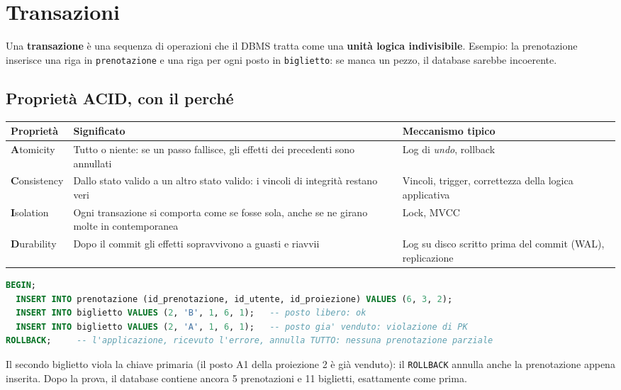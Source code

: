 \section{Transazioni}
Una \textbf{transazione} è una sequenza di operazioni che il DBMS tratta come una \textbf{unità logica indivisibile}. Esempio: la prenotazione inserisce una riga in \texttt{prenotazione} e una riga per ogni posto in \texttt{biglietto}: se manca un pezzo, il database sarebbe incoerente.

\subsection{Proprietà ACID, con il perché}
\begin{center}
\small
\begin{tabularx}{\textwidth}{@{}>{\raggedright\arraybackslash}p{2.4cm}XX@{}}
\toprule
\textbf{Proprietà} & \textbf{Significato} & \textbf{Meccanismo tipico} \\
\midrule
\textbf{A}tomicity & Tutto o niente: se un passo fallisce, gli effetti dei precedenti sono annullati & Log di \emph{undo}, rollback \\
\textbf{C}onsistency & Dallo stato valido a un altro stato valido: i vincoli di integrità restano veri & Vincoli, trigger, correttezza della logica applicativa \\
\textbf{I}solation & Ogni transazione si comporta come se fosse sola, anche se ne girano molte in contemporanea & Lock, MVCC \\
\textbf{D}urability & Dopo il commit gli effetti sopravvivono a guasti e riavvii & Log su disco scritto prima del commit (WAL), replicazione \\
\bottomrule
\end{tabularx}
\end{center}

\begin{lstlisting}[language=SQL, caption={Transazione: o tutto o niente}]
BEGIN;
  INSERT INTO prenotazione (id_prenotazione, id_utente, id_proiezione) VALUES (6, 3, 2);
  INSERT INTO biglietto VALUES (2, 'B', 1, 6, 1);   -- posto libero: ok
  INSERT INTO biglietto VALUES (2, 'A', 1, 6, 1);   -- posto gia' venduto: violazione di PK
ROLLBACK;     -- l'applicazione, ricevuto l'errore, annulla TUTTO: nessuna prenotazione parziale
\end{lstlisting}
Il secondo biglietto viola la chiave primaria (il posto A1 della proiezione 2 è già venduto): il \texttt{ROLLBACK} annulla anche la prenotazione appena inserita. Dopo la prova, il database contiene ancora 5 prenotazioni e 11 biglietti, esattamente come prima.

